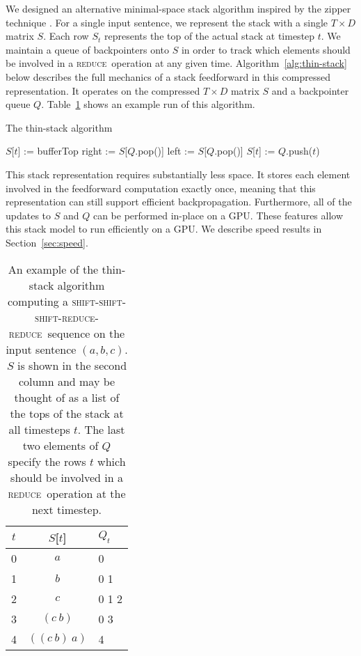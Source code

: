 \documentclass[11pt]{article}
\newcommand{\shift}{\textsc{shift}}
\newcommand{\reduce}{\textsc{reduce}}
\begin{document}
We designed an alternative minimal-space stack algorithm inspired by the zipper technique \citep{huet1997zipper}. For a single input sentence, we represent the stack with a single $T \times D$ matrix $S$. Each row $S_t$ represents the top of the actual stack at timestep $t$. We maintain a queue of backpointers onto $S$ in order to track which elements should be involved in a \reduce~operation at any given time. Algorithm~\ref{alg:thin-stack} below describes the full mechanics of a stack feedforward in this compressed representation. It operates on the compressed $T \times D$ matrix $S$ and a backpointer queue $Q$. Table~\ref{tbl:thin-stack} shows an example run of this algorithm.

\begin{algorithm}
\caption{The thin-stack algorithm}
\label{alg:thin-stack}
\begin{algorithmic}[1]
    \If{op = \shift}
      \State $S$[$t$] := bufferTop
    \ElsIf{op = \reduce}
      \State right := $S$[$Q$.pop()]
      \State left := $S$[$Q$.pop()]
      \State $S$[$t$] := 
    \EndIf
    \State $Q$.push($t$)
  \EndFunction
\end{algorithmic}
\end{algorithm}

This stack representation requires substantially less space. It stores each element involved in the feedforward computation exactly once, meaning that this representation can still support efficient backpropagation. Furthermore, all of the updates to $S$ and $Q$ can be performed in-place on a GPU. These features allow this stack model to run efficiently on a GPU. We describe speed results in Section~\ref{sec:speed}.

\begin{table}
\centering
\begin{tabular}{c|cl}
  \toprule
  $t$ & $S$[$t$] & $Q_t$ \\
  \midrule
  0 & $a$ & 0 \\
  1 & $b$ & 0 1 \\
  2 & $c$ & 0 1 2 \\
  3 & $(c~b)$ & 0 3 \\
  4 & $((c~b)~a)$ & 4 \\
  \bottomrule
\end{tabular}
\caption{An example of the thin-stack algorithm computing a \shift-\shift-\shift-\reduce-\reduce~sequence on the input sentence $(a, b, c)$. $S$ is shown in the second column and may be thought of as a list of the tops of the stack at all timesteps $t$. The last two elements of $Q$ specify the rows $t$ which should be involved in a \reduce~operation at the next timestep.}
\label{tbl:thin-stack}
\end{table}
\end{document}
